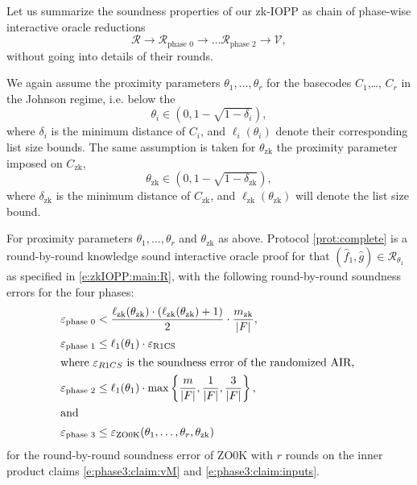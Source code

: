 Let us summarize the soundness properties of our zk-IOPP as chain of phase-wise interactive oracle reductions
\[
\mathcal R \longrightarrow \mathcal R_\text{phase 0} \longrightarrow \ldots \mathcal R_\text{phase 2} \longrightarrow \mathcal V,
\]
without going into details of their rounds. 

We again assume the proximity parameters $\theta_1,\ldots, \theta_r$ for the basecodes $C_1$,\ldots, $C_r$ in the Johnson regime, i.e. below the 
\begin{equation}
\label{e:theta:i:below:Johnson}
\theta_i \in (0,  1 - \sqrt{1 -\delta_i}),
\end{equation}
where $\delta_i$ is the minimum distance of $C_i$, and $\ell_i(\theta_i)$ denote their corresponding list size bounds. 
The same assumption is taken for $\theta_\text{zk}$ the proximity parameter imposed on $C_\text{zk}$,
\begin{equation}
\label{e:theta:zk:below:Johnson}
\theta_\text{zk} \in (0, 1 - \sqrt{1 -\delta_\text{zk}}), 
\end{equation}
where $\delta_\text{zk}$ is the minimum distance of $C_\text{zk}$, and $\ell_\text{zk}(\theta_\text{zk})$ will denote the list size bound. 


\begin{thm}
\label{thm:zk:soundness:informal}
For proximity parameters $\theta_1,\ldots, \theta_r$ and $\theta_\text{zk}$ as above.
Protocol \ref{prot:complete} is a round-by-round knowledge sound interactive oracle proof for that $(\hat f_1, \hat g)\in \mathcal R_{\theta_1}$ as specified in \eqref{e:zkIOPP:main:R}, with the following round-by-round soundness errors for the four phases:
\begin{align}
\label{e:zkIOPP:phase0:soundness:error}
\varepsilon_\text{phase 0} 
&< \frac{\ell_\text{zk}(\theta_\text{zk})\cdot (\ell_\text{zk}(\theta_\text{zk}) + 1)}{2} \cdot \frac{m_\text{zk}}{|F|},
\\
\label{e:zkIOPP:phase1:soundness:error}
\varepsilon_\text{phase 1} 
&\leq 
    \ell_1(\theta_1) \cdot \varepsilon_\text{R1CS} 
\\\intertext{%
where $\varepsilon_{R1CS}$ is the soundness error of the randomized AIR, 
}\label{e:zkIOPP:phase2:soundness:error}
\varepsilon_\text{phase 2}  
&\leq \ell_1(\theta_1) \cdot \max\left\{\frac{m}{|F|}, \frac{1}{|F|}, \frac{3}{|F|}\right\},
\\\intertext{and}
\label{e:zkIOPP:phase3:soundness:error}
\varepsilon_\text{phase 3} &\leq 
\varepsilon_\text{ZO0K}(\theta_1,\ldots, \theta_r,\theta_\text{zk})
\end{align}
for the round-by-round soundness error of ZO0K with $r$ rounds on the inner product claims \eqref{e:phase3:claim:vM} and \eqref{e:phase3:claim:inputs}.
\end{thm}


